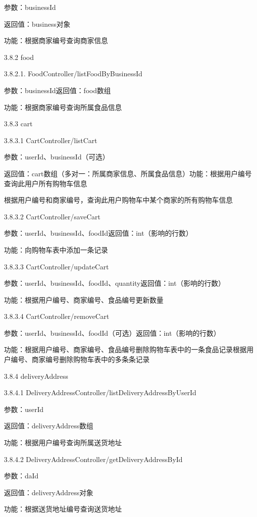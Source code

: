     参数：businessId

    返回值：business对象

    功能：根据商家编号查询商家信息

    \protect\hypertarget{2.3.2.food}{}{}3.8.2 food

    3.8.2.1. FoodController/listFoodByBusinessId

    参数：businessId返回值：food数组

    功能：根据商家编号查询所属食品信息

    \protect\hypertarget{2.3.3.cart}{}{}3.8.3 cart

    3.8.3.1 CartController/listCart

    参数：userId、businessId（可选）

    返回值：cart数组（多对一：所属商家信息、所属食品信息）功能：根据用户编号查询此用户所有购物车信息

    根据用户编号和商家编号，查询此用户购物车中某个商家的所有购物车信息

    3.8.3.2 CartController/saveCart

    参数：userId、businessId、foodId返回值：int（影响的行数）

    功能：向购物车表中添加一条记录

    3.8.3.3 CartController/updateCart

    参数：userId、businessId、foodId、quantity返回值：int（影响的行数）

    功能：根据用户编号、商家编号、食品编号更新数量

    3.8.3.4 CartController/removeCart

    参数：userId、businessId、foodId（可选）返回值：int（影响的行数）

    功能：根据用户编号、商家编号、食品编号删除购物车表中的一条食品记录根据用户编号、商家编号删除购物车表中的多条条记录

    \protect\hypertarget{2.3.4.deliveryAddress}{}{}3.8.4 deliveryAddress

    3.8.4.1 DeliveryAddressController/listDeliveryAddressByUserId

    参数：userId

    返回值：deliveryAddress数组

    功能：根据用户编号查询所属送货地址

    3.8.4.2 DeliveryAddressController/getDeliveryAddressById

    参数：daId

    返回值：deliveryAddress对象

    功能：根据送货地址编号查询送货地址

